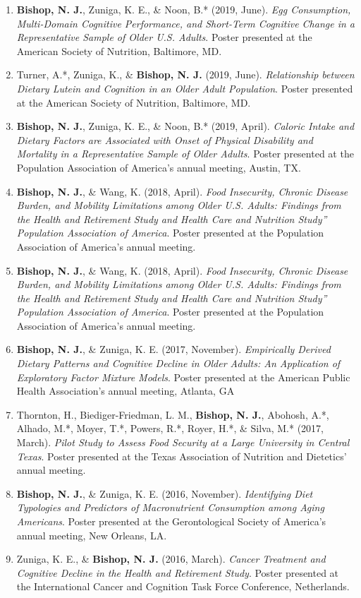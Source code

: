 \documentclass[
]{article}
\begin{document}
\begin{enumerate}
{  Development of Memory, Disability, and Comorbidity in US Adults Age 65
  and Older.} Poster presented at the Gerontological Society of
  America's annual meeting, Austin, TX.
\item
  \textbf{Bishop, N. J.}, Zuniga, K. E., \& Noon, B.* (2019, June).
  \emph{Egg Consumption, Multi-Domain Cognitive Performance, and
  Short-Term Cognitive Change in a Representative Sample of Older U.S.
  Adults}. Poster presented at the American Society of Nutrition,
  Baltimore, MD.
\item
  Turner, A.*, Zuniga, K., \& \textbf{Bishop, N. J.} (2019, June).
  \emph{Relationship between Dietary Lutein and Cognition in an Older
  Adult Population}. Poster presented at the American Society of
  Nutrition, Baltimore, MD.
\item
  \textbf{Bishop, N. J.}, Zuniga, K. E., \& Noon, B.* (2019, April).
  \emph{Caloric Intake and Dietary Factors are Associated with Onset of
  Physical Disability and Mortality in a Representative Sample of Older
  Adults}. Poster presented at the Population Association of America's
  annual meeting, Austin, TX.
\item
  \textbf{Bishop, N. J.}, \& Wang, K. (2018, April). \emph{Food
  Insecurity, Chronic Disease Burden, and Mobility Limitations among
  Older U.S. Adults: Findings from the Health and Retirement Study and
  Health Care and Nutrition Study'' Population Association of America}.
  Poster presented at the Population Association of America's annual
  meeting.
\item
  \textbf{Bishop, N. J.}, \& Wang, K. (2018, April). \emph{Food
  Insecurity, Chronic Disease Burden, and Mobility Limitations among
  Older U.S. Adults: Findings from the Health and Retirement Study and
  Health Care and Nutrition Study'' Population Association of America}.
  Poster presented at the Population Association of America's annual
  meeting.
\item
  \textbf{Bishop, N. J.}, \& Zuniga, K. E. (2017, November).
  \emph{Empirically Derived Dietary Patterns and Cognitive Decline in
  Older Adults: An Application of Exploratory Factor Mixture Models}.
  Poster presented at the American Public Health Association's annual
  meeting, Atlanta, GA
\item
  Thornton, H., Biediger-Friedman, L. M., \textbf{Bishop, N. J.},
  Abohosh, A.*, Alhado, M.*, Moyer, T.*, Powers, R.*, Royer, H.*, \&
  Silva, M.* (2017, March). \emph{Pilot Study to Assess Food Security at
  a Large University in Central Texas}. Poster presented at the Texas
  Association of Nutrition and Dietetics' annual meeting.
\item
  \textbf{Bishop, N. J.}, \& Zuniga, K. E. (2016, November).
  \emph{Identifying Diet Typologies and Predictors of Macronutrient
  Consumption among Aging Americans}. Poster presented at the
  Gerontological Society of America's annual meeting, New Orleans, LA.
\item
  Zuniga, K. E., \& \textbf{Bishop, N. J.} (2016, March). \emph{Cancer
  Treatment and Cognitive Decline in the Health and Retirement Study}.
  Poster presented at the International Cancer and Cognition Task Force
  Conference, Netherlands.
\end{enumerate}
\end{document}
